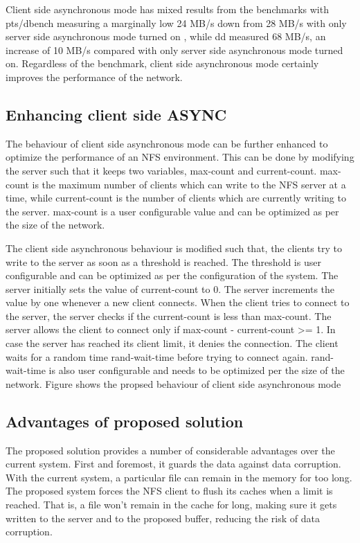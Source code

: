 \documentclass[conference]{IEEEtran}
\begin{document}
Client side asynchronous mode has mixed results from the benchmarks with
pts/dbench measuring a marginally low 24 MB/s down from 28 MB/s with only 
server side asynchronous mode turned on , while dd measured 68 MB/s, an 
increase of 10 MB/s compared with only server side asynchronous mode turned
on. Regardless of the benchmark, client side asynchronous mode certainly
improves the performance of the network.

\subsection{Enhancing client side ASYNC }\label{SCM}
The behaviour of client side asynchronous mode can be further enhanced to 
optimize the performance of an NFS environment. This can be done by
modifying the server such that it keeps two variables, max-count and 
current-count. max-count is the maximum number of clients which can write 
to the NFS server at a time, while current-count is the number of clients 
which are currently writing to the server. max-count is a user configurable
value and can be optimized as per the size of the network.

The client side asynchronous behaviour is modified such that, the clients 
try to write to the server as soon as a threshold is reached. The threshold
is user configurable and can be optimized as per the configuration of the
system. The server initially sets the value of current-count to 0. The 
server increments the value by one whenever a new client connects. When the
client tries to connect to the server, the server checks if the
current-count is less than max-count. The server allows the client to
connect only if max-count - current-count >= 1. In case the server has
reached its client limit, it denies the connection. The client waits for a
random time rand-wait-time before trying to connect again. rand-wait-time
is also user configurable and needs to be optimized per the size of the
network.
Figure shows the propsed behaviour of client side asynchronous mode
\subsection{Advantages of proposed solution}
The proposed solution provides a number of considerable advantages over the
current system. First and foremost, it guards the data against data 
corruption. With the current system, a particular file can remain in the
memory for too long. The proposed system forces the NFS client to flush its
caches when a limit is reached. That is, a file won't remain in the cache
for long, making sure it gets written to the server and to the proposed
buffer, reducing the risk of data corruption.
\end{document}
